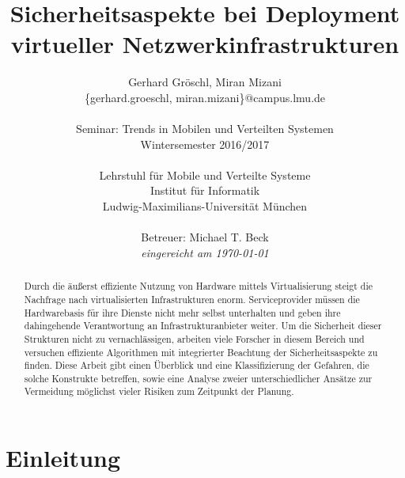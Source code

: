 \documentclass{lni}
\author{Gerhard Gröschl, Miran Mizani\\\{gerhard.groeschl, miran.mizani\}@campus.lmu.de\\\\
Seminar: Trends in Mobilen und Verteilten Systemen \\Wintersemester 2016/2017\\\\
Lehrstuhl für Mobile und Verteilte Systeme\\Institut für Informatik\\Ludwig-Maximilians-Universität München\\\\
Betreuer: Michael T. Beck\\\textit{eingereicht am \today}}
\title{Sicherheitsaspekte bei Deployment virtueller Netzwerkinfrastrukturen}
\begin{document}
\maketitle

\vfill

\begin{abstract}
Durch die äußerst effiziente Nutzung von Hardware mittels Virtualisierung steigt die Nachfrage nach virtualisierten Infrastrukturen enorm. Serviceprovider müssen die Hardwarebasis für ihre Dienste nicht mehr selbst unterhalten und geben ihre dahingehende Verantwortung an Infrastrukturanbieter weiter. Um die Sicherheit dieser Strukturen nicht zu vernachlässigen, arbeiten viele Forscher in diesem Bereich und versuchen effiziente Algorithmen mit integrierter Beachtung der Sicherheitsaspekte zu finden. Diese Arbeit gibt einen Überblick und eine Klassifizierung der Gefahren, die solche Konstrukte betreffen, sowie eine Analyse zweier unterschiedlicher Ansätze zur Vermeidung möglichst vieler Risiken zum Zeitpunkt der Planung.
\end{abstract}


\newpage
\tableofcontents
\newpage

\section{Einleitung}
\label{sec:Einleitung}





\end{document}
